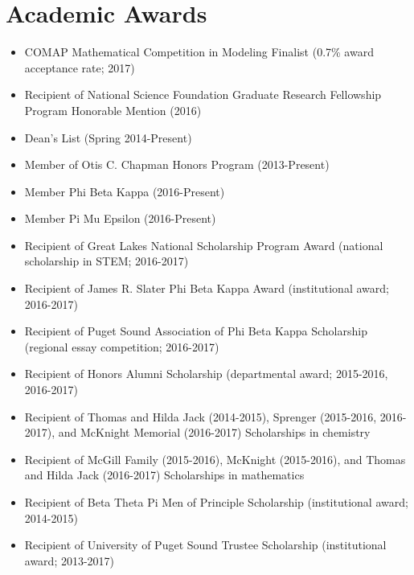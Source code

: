 \section{Academic Awards}
 \begin{itemize}
 \item COMAP Mathematical Competition in Modeling Finalist (0.7\% award acceptance rate; 2017)
 \item Recipient of National Science Foundation Graduate Research Fellowship Program Honorable Mention (2016)
 \item Dean's List (Spring 2014-Present)
 \item Member of Otis C. Chapman Honors Program (2013-Present)
 \item Member Phi Beta Kappa (2016-Present)
 \item Member Pi Mu Epsilon (2016-Present)
 \item Recipient of Great Lakes National Scholarship Program Award (national scholarship in STEM; 2016-2017)
 \item Recipient of James R. Slater Phi Beta Kappa Award (institutional award; 2016-2017)
 \item Recipient of Puget Sound Association of Phi Beta Kappa Scholarship (regional essay competition; 2016-2017)
 \item Recipient of Honors Alumni Scholarship (departmental award; 2015-2016, 2016-2017)
 \item Recipient of Thomas and Hilda Jack (2014-2015), Sprenger (2015-2016, 2016-2017), and McKnight Memorial (2016-2017) Scholarships in chemistry
 \item Recipient of McGill Family (2015-2016), McKnight (2015-2016), and Thomas and Hilda Jack (2016-2017) Scholarships in mathematics
 \item Recipient of Beta Theta Pi Men of Principle Scholarship (institutional award; 2014-2015)
 \item Recipient of University of Puget Sound Trustee Scholarship (institutional award; 2013-2017)
 \end{itemize}
\vspace{-3.5mm}
